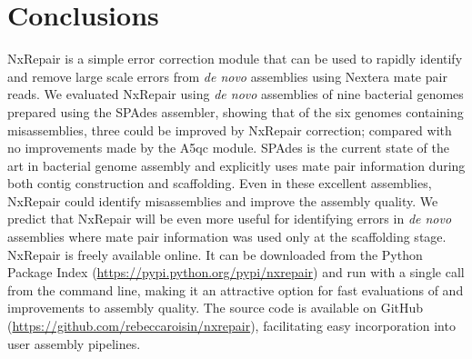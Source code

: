 \section{Conclusions}
NxRepair is a simple error correction module that can be used to rapidly identify and remove large scale errors from \textit{de novo} assemblies using Nextera mate pair reads. We evaluated NxRepair using \textit{de novo} assemblies of nine bacterial genomes prepared using the SPAdes assembler, showing that of the six genomes containing misassemblies, three could be improved by NxRepair correction; compared with no improvements made by the A5qc module. SPAdes is the current state of the art in bacterial genome assembly and explicitly uses mate pair information during both contig construction and scaffolding. Even in these excellent assemblies, NxRepair could identify misassemblies and improve the assembly quality. We predict that NxRepair will be even more useful for identifying errors in \textit{de novo} assemblies where mate pair information was used only at the scaffolding stage. NxRepair is freely available online. It can be downloaded from the Python Package Index (\url{https://pypi.python.org/pypi/nxrepair}) and run with a single call from the command line, making it an attractive option for fast evaluations of and improvements to assembly quality. The source code is available on GitHub (\url{https://github.com/rebeccaroisin/nxrepair}), facilitating easy incorporation into user assembly pipelines.  

